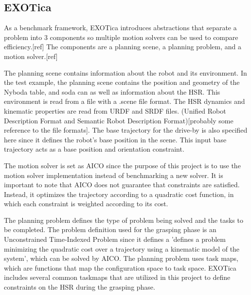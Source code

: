 \documentclass[12pt]{article}
\begin{document}
        \subsection{EXOTica \cite{koubaa_exotica_2019}}
            As a benchmark framework, EXOTica introduces abstractions that separate a problem into 3 components so multiple motion solvers can be used to compare efficiency.[ref] The components are a planning scene, a planning problem, and a motion solver.[ref]
                
            \par The planning scene contains information about the robot and its environment. In the test example, the planning scene contains the position and geometry of the Nyboda table, and soda can as well as information about the HSR. This environment is read from a file with a .scene file format. The HSR dynamics and kinematic properties are read from URDF and SRDF files. (Unified Robot Description Format and Semantic Robot Description Format)[probably some reference to the file formats]. The base trajectory for the drive-by is also specified here since it defines the robot's base position in the scene. This input base trajectory acts as a base position and orientation constraint.

            \par The motion solver is set as AICO since the purpose of this project is to use the motion solver implementation instead of benchmarking a new solver. It is important to note that AICO does not guarantee that constraints are satisfied. Instead, it optimizes the trajectory according to a quadratic cost function, in which each constraint is weighted according to its cost.

            \par The planning problem defines the type of problem being solved and the tasks to be completed. The problem definition used for the grasping phase is an Unconstrained Time-Indexed Problem since it defines a 'defines a problem minimizing the quadratic cost over a trajectory using a kinematic model of the system', which can be solved by AICO. The planning problem uses task maps, which are functions that map the configuration space to task space. EXOTica includes several common taskmaps that are utilized in this project to define constraints on the HSR during the grasping phase.
            
\end{document}
